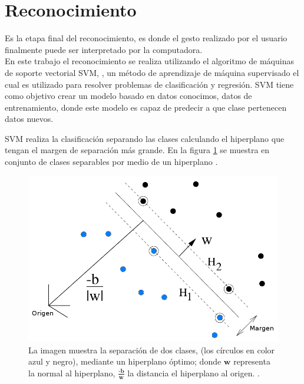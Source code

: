 

\section{Reconocimiento}\label{sec:SVM} 

Es la etapa final del reconocimiento, es donde el gesto realizado por el usuario finalmente puede ser interpretado por la computadora.\\  
En este trabajo el reconocimiento se realiza utilizando el algoritmo de máquinas de soporte vectorial SVM, \citep{Cortes1995}, un método de aprendizaje de máquina supervisado el cual es utilizado para resolver problemas de clasificación y regresión. SVM tiene como objetivo crear un modelo basado en datos conocimos, datos de entrenamiento, donde este modelo es capaz de predecir a que clase pertenecen datos nuevos. 

SVM realiza la clasificación separando las clases calculando el hiperplano que tengan el margen de separación más grande. En la figura \ref{fig:SVM} se muestra en conjunto de clases separables por medio de un hiperplano .  

\begin{figure}[h!]
\begin{center}
\includegraphics[scale=.55]{./Figures/SVMarticle.png}
\end{center}
\caption{La imagen muestra la separación de dos clases, (los círculos en color azul y negro), mediante un hiperplano óptimo; donde $\textbf{w}$ representa la normal al hiperplano, $\frac{\textbf{-b}}{\textbf{w}}$ la distancia el hiperplano al origen. \citep{Burges1998}.}
\label{fig:SVM}
\end{figure} 

